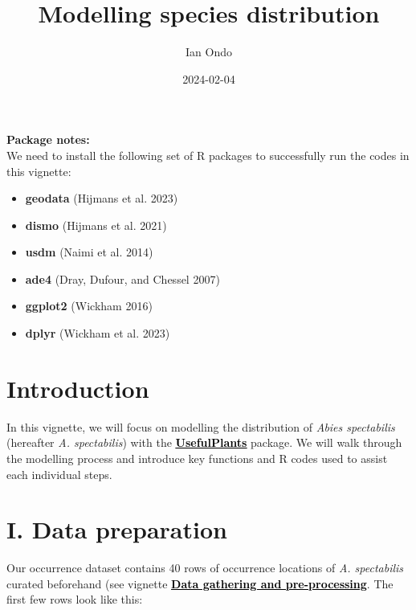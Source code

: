 \documentclass[
]{article}
\title{Modelling species distribution}
\author{Ian Ondo}
\date{2024-02-04}
\providecommand{\tightlist}{%
  \setlength{\itemsep}{0pt}\setlength{\parskip}{0pt}}
\begin{document}
\maketitle

{
\setcounter{tocdepth}{2}
\tableofcontents
}
\begin{warningbox}

\textbf{Package notes:}\\
We need to install the following set of R packages to successfully run
the codes in this vignette:

\begin{itemize}
\tightlist
\item
  \textbf{geodata} (Hijmans et al. 2023)
\item
  \textbf{dismo} (Hijmans et al. 2021)
\item
  \textbf{usdm} (Naimi et al. 2014)
\item
  \textbf{ade4} (Dray, Dufour, and Chessel 2007)
\item
  \textbf{ggplot2} (Wickham 2016)
\item
  \textbf{dplyr} (Wickham et al. 2023)
\end{itemize}

\end{warningbox}

\hypertarget{introduction}{%
\section{Introduction}\label{introduction}}

In this vignette, we will focus on modelling the distribution of
\emph{Abies spectabilis} (hereafter \emph{A. spectabilis}) with the
\href{https://github.com/IanOndo/UsefulPlants}{\textbf{\textcolor{black}{\underline{UsefulPlants}}}}
package. We will walk through the modelling process and introduce key
functions and R codes used to assist each individual steps.

\hypertarget{i.-data-preparation}{%
\section{I. Data preparation}\label{i.-data-preparation}}

Our occurrence dataset contains 40 rows of occurrence locations of
\emph{A. spectabilis} curated beforehand (see vignette
\href{}{\textbf{\textcolor{black}{\underline{Data gathering and pre-processing}}}}.
The first few rows look like this:
\end{document}
